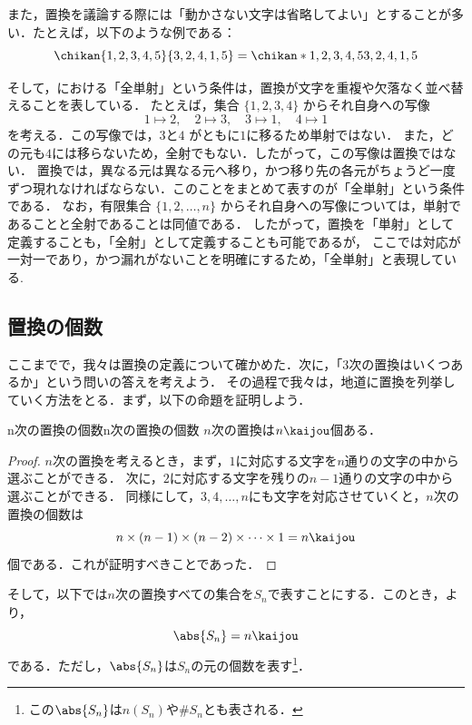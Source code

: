 また，置換を議論する際には「動かさない文字は省略してよい」とすることが多い．たとえば，以下のような例である：
\[
\chikan{1, 2, 3, 4, 5}{3, 2, 4, 1, 5} = \chikan*{1, 2, 3, 4, 5}{3, 2, 4, 1, 5}
\]

そして，における「全単射」という条件は，置換が文字を重複や欠落なく並べ替えることを表している．
たとえば，集合 $\{1,2,3,4\}$ からそれ自身への写像
\[
1\mapsto2,\quad
2\mapsto3,\quad
3\mapsto1,\quad
4\mapsto1
\]
を考える．この写像では，$3$と$4$ がともに$1$に移るため単射ではない．
また，どの元も$4$には移らないため，全射でもない．したがって，この写像は置換ではない．
置換では，異なる元は異なる元へ移り，かつ移り先の各元がちょうど一度ずつ現れなければならない．このことをまとめて表すのが「全単射」という条件である．
なお，有限集合 $\{1,2,\dots,n\}$ からそれ自身への写像については，単射であることと全射であることは同値である．
したがって，置換を「単射」として定義することも，「全射」として定義することも可能であるが，
ここでは対応が一対一であり，かつ漏れがないことを明確にするため，「全単射」と表現している.

\subsection{置換の個数}

ここまでで，我々は置換の定義について確かめた．次に，「$3$次の置換はいくつあるか」という問いの答えを考えよう．
その過程で我々は，地道に置換を列挙していく方法をとる．まず，以下の命題を証明しよう．

\begin{prop}{n次の置換の個数}{n次の置換の個数}
  $n$次の置換は$n\kaijou$個ある．
\end{prop}

\begin{leftbar}
\begin{proof}
  $n$次の置換を考えるとき，まず，$1$に対応する文字を$n$通りの文字の中から選ぶことができる．
  次に，$2$に対応する文字を残りの$n-1$通りの文字の中から選ぶことができる．
  同様にして，$3,4,\ldots,n$にも文字を対応させていくと，$n$次の置換の個数は
  \[
  n \times (n-1) \times (n-2) \times \cdots \times 1 = n\kaijou
  \]
  個である．これが証明すべきことであった．
\end{proof}
\end{leftbar}

そして，以下では$n$次の置換すべての集合を$S_n$で表すことにする．このとき，より，
\[
\abs{S_n} = n\kaijou
\]
である．ただし，$\abs{S_n}$は$S_n$の元の個数を表す\footnote{この$\abs{S_n}$は$n(S_n)$や$\# S_n$とも表される．}．

